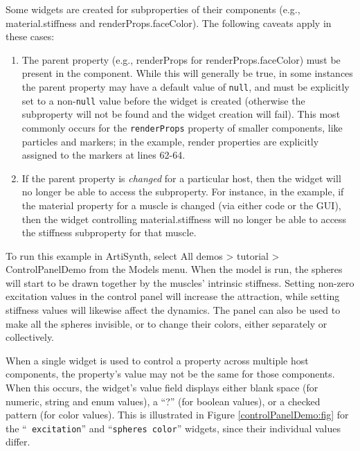 Some widgets are created for subproperties of their components (e.g.,
{\sf material.stiffness} and {\sf renderProps.faceColor}). The
following caveats apply in these cases:

\begin{enumerate}

\item The parent property (e.g., {\sf renderProps} for 
{\sf renderProps.faceColor}) must be present in the component.  While
this will generally be true, in some instances the parent property may
have a default value of {\tt null}, and must be explicitly set to a
non-{\tt null} value before the widget is created (otherwise the
subproperty will not be found and the widget creation will fail). This
most commonly occurs for the {\tt renderProps} property of smaller
components, like particles and markers; in the example, render
properties are explicitly assigned to the markers at lines 62-64.

\item If the parent property is {\it changed} for a particular
host, then the widget will no longer be able to access the
subproperty.  For instance, in the example, if the {\sf material}
property for a muscle is changed (via either code or the GUI), then
the widget controlling {\sf material.stiffness} will no longer be
able to access the {\sf stiffness} subproperty for that muscle.

\end{enumerate}

To run this example in ArtiSynth, select {\sf All demos > tutorial >
ControlPanelDemo} from the {\sf Models} menu. When the model is run,
the spheres will start to be drawn together by the muscles' intrinsic
stiffness.  Setting non-zero excitation values in the control panel
will increase the attraction, while setting stiffness values will
likewise affect the dynamics. The panel can also be used to make all
the spheres invisible, or to change their colors, either separately or
collectively.

\begin{sideblock}
When a single widget is used to control a property across multiple
host components, the property's value may not be the same for those
components. When this occurs, the widget's value field displays either
blank space (for numeric, string and enum values), a ``?'' (for
boolean values), or a checked pattern (for color values).  This is
illustrated in Figure \ref{controlPanelDemo:fig} for the ``{\tt
excitation}'' and ``{\tt spheres color}'' widgets, since their
individual values differ.
\end{sideblock}


